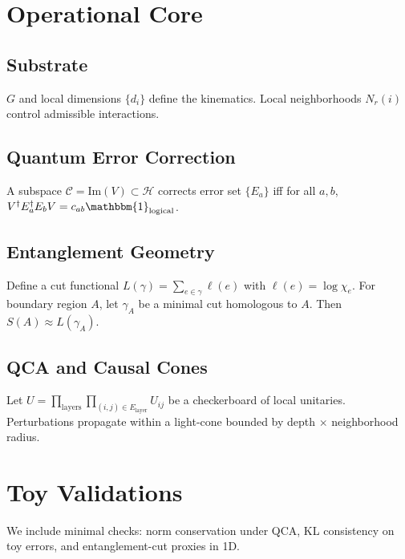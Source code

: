 \documentclass[11pt]{article}
\begin{document}
\section{Operational Core}
\subsection{Substrate}
$G$ and local dimensions $\{d_i\}$ define the kinematics. Local neighborhoods $N_r(i)$ control admissible interactions.

\subsection{Quantum Error Correction}
\begin{defn}\label{def:KL}
A subspace $\mathcal{C} = \mathrm{Im}(V)\subset \mathcal{H}$ corrects error set $\{E_a\}$ iff for all $a,b$,
$V^\dagger E_a^\dagger E_b V = c_{ab} \mathbbm{1}_{\mathrm{logical}}$.
\end{defn}

\subsection{Entanglement Geometry}
Define a cut functional $L(\gamma) = \sum_{e\in \gamma} \ell(e)$ with $\ell(e)=\log \chi_e$. For boundary region $A$, let $\gamma_A$ be a minimal cut homologous to $A$. Then
$S(A) \approx L(\gamma_A)$.

\subsection{QCA and Causal Cones}
Let $U=\prod_{\text{layers}} \prod_{(i,j)\in E_{\text{layer}}} U_{ij}$ be a checkerboard of local unitaries. Perturbations propagate within a light-cone bounded by depth $\times$ neighborhood radius.

\section{Toy Validations}
We include minimal checks: norm conservation under QCA, KL consistency on toy errors, and entanglement-cut proxies in 1D.



\end{document}
